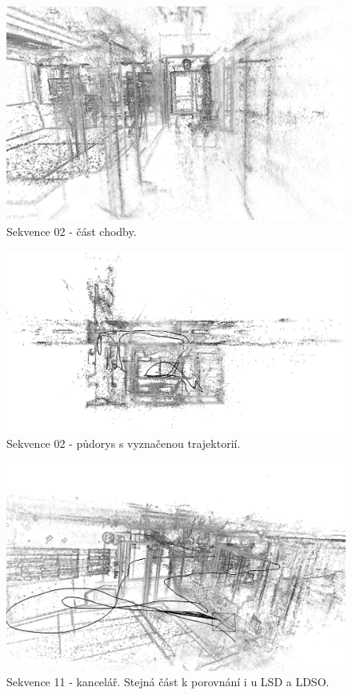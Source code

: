 \documentclass[12pt,a4paper]{report}
\begin{document}
\begin{figure}[H]
\centering
\includegraphics[width=1.0\textwidth]{img/DSO_02_chodba.png}
\caption{Sekvence 02 - část chodby.}
\end{figure} 

\begin{figure}[H]
\centering
\includegraphics[width=1.0\textwidth]{img/DSO_02_top_b.png}
\caption{Sekvence 02 - půdorys s vyznačenou trajektorií.}
\end{figure} 

\begin{figure}[H]
\centering
\includegraphics[width=1.0\textwidth]{img/DSO_11_kancl_b.png}
\caption{Sekvence 11 - kancelář. Stejná část k porovnání i u LSD a LDSO.}
\end{figure} 
\end{document}
